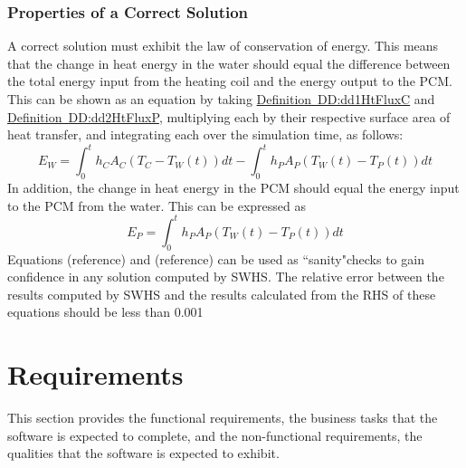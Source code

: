 \documentclass[12pt]{article}
\begin{document}
\subsubsection{Properties of a Correct Solution}
\label{Sec:PoaCS}
A correct solution must exhibit the law of conservation of energy. This means that the change in heat energy in the water should equal the difference between the total energy input from the heating coil and the energy output to the PCM. This can be shown as an equation by taking \hyperref[DD:dd1HtFluxC]{Definition~DD:dd1HtFluxC} and \hyperref[DD:dd2HtFluxP]{Definition~DD:dd2HtFluxP}, multiplying each by their respective surface area of heat transfer, and integrating each over the simulation time, as follows:
\begin{equation}
E_{W}=\int_{0}^{t}{h_{C}A_{C}(T_{C}-T_{W}(t))dt}-\int_{0}^{t}{h_{P}A_{P}(T_{W}(t)-T_{P}(t))dt}
\end{equation}
In addition, the change in heat energy in the PCM should equal the energy input to the PCM from the water. This can be expressed as
\begin{equation}
E_{P}=\int_{0}^{t}{h_{P}A_{P}(T_{W}(t)-T_{P}(t))dt}
\end{equation}
Equations (reference) and (reference) can be used as ``sanity"checks to gain confidence in any solution computed by SWHS. The relative error between the results computed by SWHS and the results calculated from the RHS of these equations should be less than 0.001%
\section{Requirements}
\label{Sec:R}
This section provides the functional requirements, the business tasks that the software is expected to complete, and the non-functional requirements, the qualities that the software is expected to exhibit.
\end{document}
